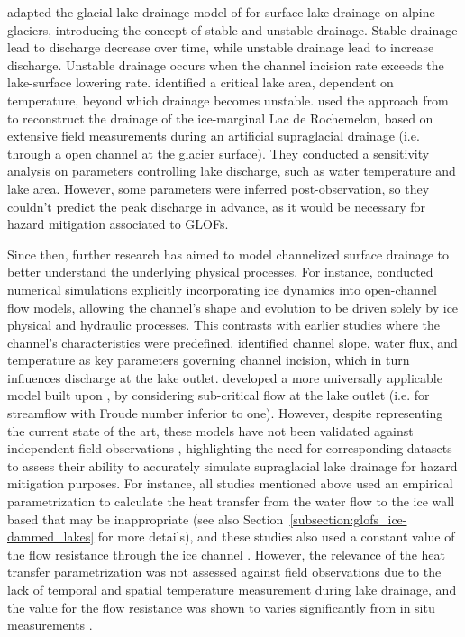 \cite{Raymond&Nolan2000} adapted the glacial lake drainage model of \cite{Walder&Costa1996} for surface lake drainage on alpine glaciers, introducing the concept of stable and unstable drainage. Stable drainage lead to discharge decrease over time, while unstable drainage lead to increase discharge. Unstable drainage occurs when the channel incision rate exceeds the lake-surface lowering rate. \cite{Raymond&Nolan2000} identified a critical lake area, dependent on temperature, beyond which drainage becomes unstable. \cite{Vincent&al2010} used the approach from \cite{Raymond&Nolan2000} to reconstruct the drainage of the ice-marginal Lac de Rochemelon, based on extensive field measurements during an artificial supraglacial drainage (i.e. through a open channel at the glacier surface). They conducted a sensitivity analysis on parameters controlling lake discharge, such as water temperature and lake area. However, some parameters were inferred post-observation, so they couldn't predict the peak discharge in advance, as it would be necessary for hazard mitigation associated to GLOFs. 

Since then, further research has aimed to model channelized surface drainage to better understand the underlying physical processes. For instance, \cite{Jarosch&Gudmundsson2012} conducted numerical simulations explicitly incorporating ice dynamics into open-channel flow models, allowing the channel's shape and evolution to be driven solely by ice physical and hydraulic processes. This contrasts with earlier studies \citep{Walder&Costa1996,Raymond&Nolan2000} where the channel's characteristics were predefined. \cite{Jarosch&Gudmundsson2012} identified channel slope, water flux, and temperature as key parameters governing channel incision, which in turn influences discharge at the lake outlet. \cite{Kingslake&al2015} developed a more universally applicable model built upon \cite{Raymond&Nolan2000}, by considering sub-critical flow at the lake outlet (i.e. for streamflow with Froude number inferior to one). However, despite representing the current state of the art, these models have not been validated against independent field observations \citep{Pitcher&Smith2019}, highlighting the need for corresponding datasets to assess their ability to accurately simulate supraglacial lake drainage for hazard mitigation purposes. For instance, all studies mentioned above used an empirical parametrization to calculate the heat transfer from the water flow to the ice wall based that may be inappropriate (see also Section~\ref{subsection:glofs_ice-dammed_lakes} for more details), and these studies also used a constant value of the flow resistance through the ice channel \citep[e.g. in][]{Clarke2003,Kingslake&al2015}. However, the relevance of the heat transfer parametrization was not assessed against field observations due to the lack of temporal and spatial temperature measurement during lake drainage, and the value for the flow resistance was shown to varies significantly from in situ measurements \citep{Gleason&al2016}.  




